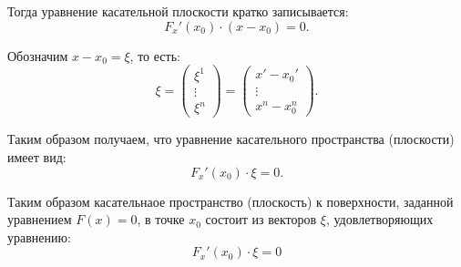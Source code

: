 Тогда уравнение касательной плоскости кратко записывается:
\[
    F_x'(x_0)\cdot(x-x_0) = 0.
\]

Обозначим $x - x_0 = \xi$, то есть:
\[
    \xi = \left(\begin{matrix}
        \xi^1  \\
        \vdots \\
        \xi^n
    \end{matrix}\right) = \left(\begin{matrix}
        x'-x_0' \\
        \vdots  \\
        x^n-x_0^n
    \end{matrix}\right).
\]

Таким образом получаем, что уравнение касательного пространства (плоскости) имеет вид:
\[
    F_x'(x_0)\cdot \xi = 0.
\]

Таким образом касательнаое пространство (плоскость) к поверхности, заданной уравнением $F(x) = 0$, в точке $x_0$ состоит из векторов $\xi$, удовлетворяющих уравнению:
\begin{equation}\label{eq:11}
    F_x'(x_0)\cdot \xi = 0
\end{equation}
